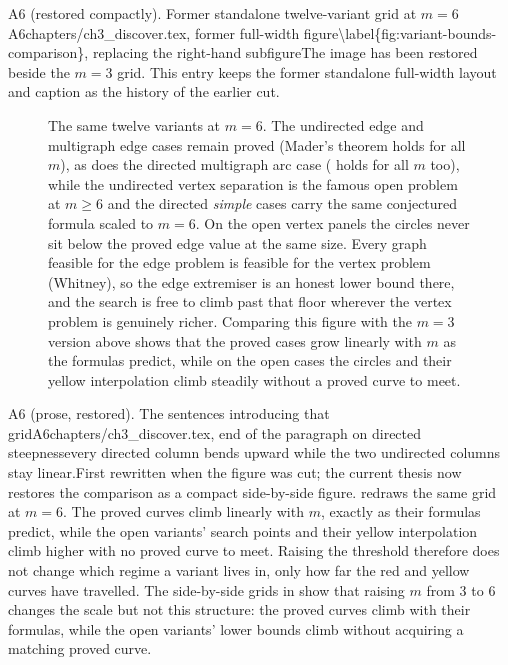 \begin{offcut}{A6 (restored compactly). Former standalone twelve-variant grid at $m = 6$}{A6}{chapters/ch3\_discover.tex, former full-width  figure}{\textbackslash{}label\{fig:variant-bounds-comparison\}, replacing the right-hand subfigure}{The image has been restored beside the $m=3$ grid. This entry keeps the former standalone full-width layout and caption as the history of the earlier cut.}
\begin{figure}[htbp]
    \centering
    \caption{The same twelve variants at $m = 6$. The undirected edge and multigraph edge cases remain proved (Mader's theorem holds for all $m$), as does the directed multigraph arc case ( holds for all $m$ too), while the undirected vertex separation is the famous open problem at $m \geq 6$ and the directed \emph{simple} cases carry the same conjectured formula scaled to $m = 6$. On the open vertex panels the circles never sit below the proved edge value at the same size. Every graph feasible for the edge problem is feasible for the vertex problem (Whitney), so the edge extremiser is an honest lower bound there, and the search is free to climb past that floor wherever the vertex problem is genuinely richer. Comparing this figure with the $m = 3$ version above shows that the proved cases grow linearly with $m$ as the formulas predict, while on the open cases the circles and their yellow interpolation climb steadily without a proved curve to meet.}
\end{figure}
\end{offcut}

\begin{offcutrewrite}{A6 (prose, restored). The sentences introducing that grid}{A6}{chapters/ch3\_discover.tex, end of the paragraph on directed steepness}{every directed column bends upward while the two undirected columns stay linear.}{First rewritten when the figure was cut; the current thesis now restores the comparison as a compact side-by-side figure.}
  redraws the same grid at $m = 6$. The proved curves climb linearly with $m$, exactly as their formulas predict, while the open variants' search points and their yellow interpolation climb higher with no proved curve to meet. Raising the threshold therefore does not change which regime a variant lives in, only how far the red and yellow curves have travelled.
\nowreads
 The side-by-side grids in  show that raising $m$ from $3$ to $6$ changes the scale but not this structure: the proved curves climb with their formulas, while the open variants' lower bounds climb without acquiring a matching proved curve.
\end{offcutrewrite}

